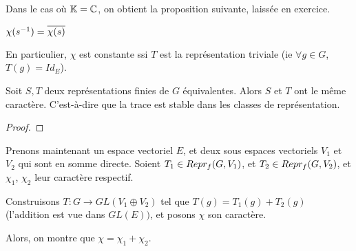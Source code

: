 Dans le cas où $\mathbb{K} = \mathbb{C}$, on obtient la proposition suivante, laissée en exercice.

\begin{proposition}
	$\chi(s^{-1}) = \overline{\chi(s)}$
\end{proposition}

En particulier, $\chi$ est constante ssi $T$ est la représentation triviale (ie $\forall g \in G$, $T(g) =
Id_{E}$).

\begin{proposition}
	Soit $S, T$ deux représentations finies de $G$ équivalentes. Alors $S$ et
	$T$ ont le même caractère. C'est-à-dire que la trace est stable dans les
	classes de représentation.
\end{proposition}

\begin{proof}

\end{proof}

Prenons maintenant un espace vectoriel $E$, et deux sous espaces vectoriels
$V_{1}$ et $V_{2}$ qui sont en somme directe.
Soient $T_{1} \in Repr_{f}(G, V_{1})$, et $T_{2} \in Repr_{f}(G, V_{2})$, et
$\chi_{1}$, $\chi_{2}$ leur caractère respectif.

Construisons $T : G \rightarrow GL(V_{1} \oplus V_{2})$ tel que $T(g) = T_{1}(g)
+ T_{2}(g)$ (l'addition est vue dans $GL(E))$, et posons $\chi$ son caractère.

Alors, on montre que $\chi = \chi_{1} + \chi_{2}$.
